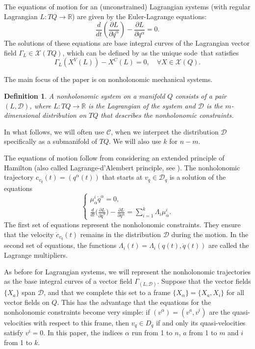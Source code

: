 \documentclass[11pt]{article}
\newtheorem{defi}{Definition}
\def\sode{{\sc sode}}
\def\D{{\mathcal D}}
\def\C{{\mathcal C}}
\begin{document}
The equations of motion for an (unconstrained) Lagrangian systems (with  regular Lagrangian $L:TQ\rightarrow \mathbb{R}$) are given by the Euler-Lagrange  equations:   
$$
\frac{d}{dt}\left(\frac{\partial L}{\partial \dot{q}^\alpha}\right)-\frac{\partial L}{\partial q^\alpha}=0.
$$ 
The solutions of these equations are base integral curves of the Lagrangian vector field $\Gamma_L\in\mathcal{X}(TQ)$, which can be defined by as the unique \sode\ that satisfies
$$
\Gamma_L(X^V(L))-X^C(L)=0,\quad\forall X \in\mathcal{X}(Q).
$$


The main focus of the paper is on nonholonomic mechanical systems.
\begin{defi}
 A nonholonomic system on a manifold $Q$ consists of a pair $(L,\mathcal{D})$, where $L:TQ\rightarrow \mathbb{R}$ is the Lagrangian of the system and $\mathcal{D}$ is the $m$-dimensional distribution on $TQ$ that describes the nonholonomic constraints.  
\end{defi}
In what follows, we will often use $\C$, when we interpret the distribution $\D$ specifically as a submanifold of $TQ$. We will also use $k$ for  $n-m$.

 The equations of motion follow from considering an extended principle of Hamilton (also called Lagrange-d'Alembert principle, see \cite{Bloch,Cortes}). The nonholonomic trajectory  $c_{v_q}(t) = (q^\alpha(t))$  that starts at $v_q\in \D_q$ is a solution of the equations 
\begin{equation}
\begin{cases}
\displaystyle\mu_\alpha^i\dot{q}^\alpha=0,
\\
\displaystyle\frac{d}{dt}\Big(\frac{\partial L}{\partial \dot{q}^\alpha}\Big)-\frac{\partial L}{\partial q^\alpha}=\sum_{i=1}^k{\Lambda_i} \mu^i_{\alpha}.
\end{cases}\nonumber 
\end{equation}
The first set of equations represent the nonholonomic constraints. They ensure that the velocity ${\dot c}_{v_q}(t)$ remains in the distribution $\D$ during the motion. In the second set of equations, {the functions $\Lambda_i(t)=\Lambda_i(q(t),\dot{q}(t))$ }are called  the Lagrange multipliers. 

As before for Lagrangian systems, we will represent the nonholonomic trajectories  as the base integral curves of a vector field $\Gamma_{(L,\mathcal{D})}$. Suppose that the vector fields $\{X_a\}$ span $\mathcal{D}$, and that we complete this set to a frame $\{X_\alpha\} = \{X_a,X_i\}$ for all vector fields on $Q$. This has the advantage that the equations for the nonholonomic constraints become very simple: if $(v^\alpha)=(v^a,v^i)$ are the quasi-velocities with respect to this frame, then $v_q\in D_q$ if and only its quasi-velocities satisfy  $v^i=0$. In this paper, the indices $\alpha$ run from 1 to $n$, $a$ from 1 to $m$ and $i$ from 1 to $k$. 
\end{document}
